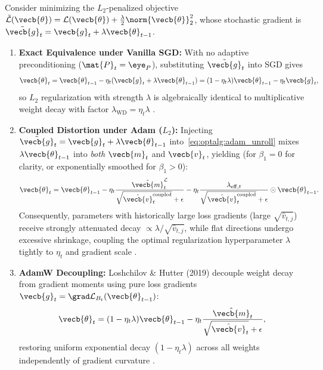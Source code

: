 \documentclass[../../../../master.tex]{subfiles}
\begin{document}
\begin{coremath}
\label{thm:optalg:adamw}
Consider minimizing the $L_2$-penalized objective $\tilde{\mathcal{L}}(\vecb{\theta}) = \mathcal{L}(\vecb{\theta}) + \frac{\lambda}{2}\norm{\vecb{\theta}}_2^2$, whose stochastic gradient is $\tilde{\vecb{g}}_t = \vecb{g}_t + \lambda\vecb{\theta}_{t-1}$.
\begin{enumerate}
  \item \textbf{Exact Equivalence under Vanilla SGD:} With no adaptive preconditioning ($\mat{P}_t = \eye_P$), substituting $\tilde{\vecb{g}}_t$ into SGD gives
  \[
    \vecb{\theta}_t = \vecb{\theta}_{t-1} - \eta_t(\vecb{g}_t + \lambda\vecb{\theta}_{t-1}) = (1 - \eta_t\lambda)\vecb{\theta}_{t-1} - \eta_t \vecb{g}_t,
  \]
  so $L_2$ regularization with strength $\lambda$ is algebraically identical to multiplicative weight decay with factor $\lambda_{\mathrm{WD}} = \eta_t\lambda$ .
  \item \textbf{Coupled Distortion under Adam ($L_2$):} Injecting $\tilde{\vecb{g}}_t = \vecb{g}_t + \lambda\vecb{\theta}_{t-1}$ into~\eqref{eq:optalg:adam_unroll} mixes $\lambda\vecb{\theta}_{t-1}$ into \emph{both} $\vecb{m}_t$ and $\vecb{v}_t$, yielding (for $\beta_1=0$ for clarity, or exponentially smoothed for $\beta_1>0$):
  \[
    \vecb{\theta}_t = \vecb{\theta}_{t-1} - \eta_t \frac{\hat{\vecb{m}}_t^{\mathcal{L}}}{\sqrt{\hat{\vecb{v}}_t^{\mathrm{coupled}}} + \epsilon}
    - \eta_t \frac{\lambda_{\mathrm{eff},t}}{\sqrt{\hat{\vecb{v}}_t^{\mathrm{coupled}}} + \epsilon} \odot \vecb{\theta}_{t-1}.
  \]
  Consequently, parameters with historically large loss gradients (large $\sqrt{\hat{v}_{t,j}}$) receive strongly attenuated decay $\propto \lambda / \sqrt{\hat{v}_{t,j}}$, while flat directions undergo excessive shrinkage, coupling the optimal regularization hyperparameter $\lambda$ tightly to $\eta_t$ and gradient scale .
  \item \textbf{AdamW Decoupling:} Loshchilov \& Hutter (2019) decouple weight decay from gradient moments using pure loss gradients $\vecb{g}_t = \grad\mathcal{L}_{B_t}(\vecb{\theta}_{t-1})$:
  \begin{equation}
  \label{eq:optalg:adamw_update}
    \vecb{\theta}_t = (1 - \eta_t \lambda)\vecb{\theta}_{t-1} - \eta_t \frac{\hat{\vecb{m}}_t}{\sqrt{\hat{\vecb{v}}_t} + \epsilon},
  \end{equation}
  restoring uniform exponential decay $(1 - \eta_t\lambda)$ across all weights independently of gradient curvature  .
\end{enumerate}
\end{coremath}
\end{document}
